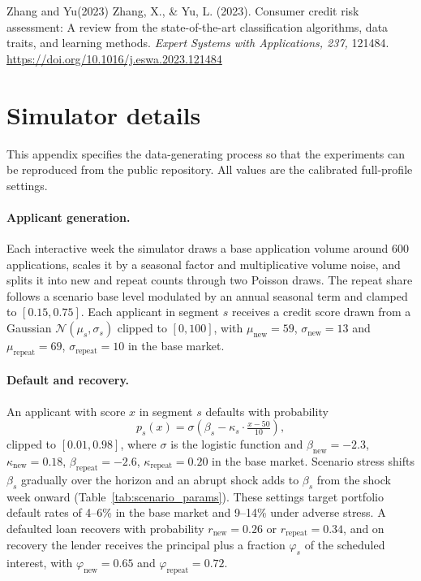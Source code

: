 \documentclass[preprint,review,authoryear,12pt]{elsarticle}
\begin{document}
\begin{thebibliography}{Zhang and Yu(2023)}
    Zhang, X., \& Yu, L. (2023).
    Consumer credit risk assessment: A review from the state-of-the-art classification
    algorithms, data traits, and learning methods.
    \textit{Expert Systems with Applications, 237,} 121484.
    \url{https://doi.org/10.1016/j.eswa.2023.121484}

\end{thebibliography}

\appendix

\section{Simulator details}
\label{app:simulator}

This appendix specifies the data-generating process so that the experiments can be reproduced from the public repository. All values are the calibrated full-profile settings.

\paragraph{Applicant generation.}
Each interactive week the simulator draws a base application volume around 600 applications, scales it by a seasonal factor and multiplicative volume noise, and splits it into new and repeat counts through two Poisson draws. The repeat share follows a scenario base level modulated by an annual seasonal term and clamped to $[0.15, 0.75]$. Each applicant in segment $s$ receives a credit score drawn from a Gaussian $\mathcal{N}(\mu_s, \sigma_s)$ clipped to $[0,100]$, with $\mu_{\text{new}}=59$, $\sigma_{\text{new}}=13$ and $\mu_{\text{repeat}}=69$, $\sigma_{\text{repeat}}=10$ in the base market.

\paragraph{Default and recovery.}
An applicant with score $x$ in segment $s$ defaults with probability
\begin{equation}
    p_s(x) = \sigma\!\left(\beta_s - \kappa_s \cdot \tfrac{x-50}{10}\right),
    \label{eq:pd}
\end{equation}
clipped to $[0.01, 0.98]$, where $\sigma$ is the logistic function and $\beta_{\text{new}}=-2.3$, $\kappa_{\text{new}}=0.18$, $\beta_{\text{repeat}}=-2.6$, $\kappa_{\text{repeat}}=0.20$ in the base market. Scenario stress shifts $\beta_s$ gradually over the horizon and an abrupt shock adds to $\beta_s$ from the shock week onward (Table~\ref{tab:scenario_params}). These settings target portfolio default rates of 4--6\% in the base market and 9--14\% under adverse stress. A defaulted loan recovers with probability $r_{\text{new}}=0.26$ or $r_{\text{repeat}}=0.34$, and on recovery the lender receives the principal plus a fraction $\varphi_s$ of the scheduled interest, with $\varphi_{\text{new}}=0.65$ and $\varphi_{\text{repeat}}=0.72$.
\end{document}
